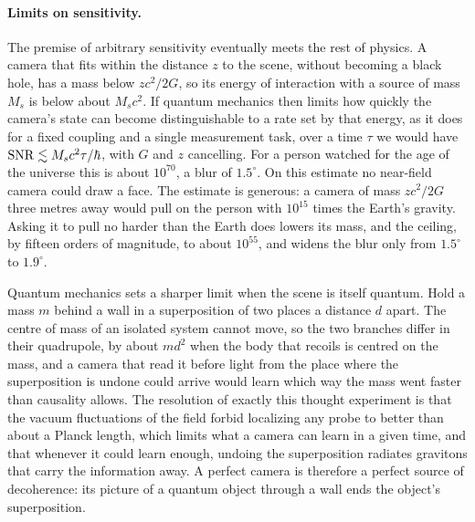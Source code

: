 \paragraph{Limits on sensitivity.} The premise of arbitrary sensitivity
eventually meets the rest of physics. A camera that fits within the distance $z$ to the scene, without
becoming a black hole, has a mass below $zc^2/2G$, so its energy of interaction
with a source of mass $M_s$ is below about $M_s c^2$. If quantum mechanics then
limits how quickly the camera's state can become distinguishable to a rate set
by that energy, as it does for a fixed coupling and a single measurement
task, over a time $\tau$ we would have $\mathrm{SNR} \lesssim M_s c^2\tau/\hbar$, with
$G$ and $z$ cancelling. For a person watched for the age of the universe this
is about $10^{70}$, a blur of $1.5^\circ$. On this estimate no near-field camera
could draw a face.
The estimate is generous: a camera of mass $zc^2/2G$ three
metres away would pull on the person with $10^{15}$ times the Earth's gravity.
Asking it to pull no harder than the Earth does lowers its mass, and the
ceiling, by fifteen orders of magnitude, to about $10^{55}$, and widens the
blur only from $1.5^\circ$ to $1.9^\circ$.

Quantum mechanics sets a sharper limit when the scene is itself quantum. Hold a
mass $m$ behind a wall in a superposition of two places a distance $d$ apart.
The centre of mass of an isolated system cannot move, so the two branches
differ in their quadrupole, by about $md^2$ when the body that recoils is centred on the mass, and a camera that read it before
light from the place where the superposition is undone could arrive would learn
which way the mass went faster than causality allows. The resolution of
exactly this thought experiment \cite{Belenchia2018,DanielsonSatishchandranWald2022}
is that the vacuum fluctuations of the field forbid localizing any probe to
better than about a Planck length, which limits what a camera can learn in a
given time, and that whenever it could learn enough, undoing the superposition
radiates gravitons that carry the information away. A perfect camera is
therefore a perfect source of decoherence: its picture of a quantum object
through a wall ends the object's superposition.

